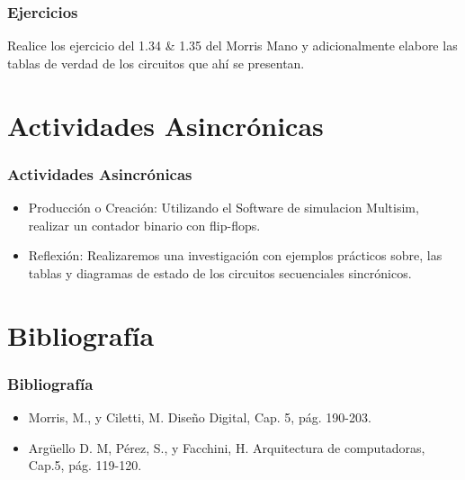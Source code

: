 \documentclass[11pt]{beamer}
\begin{document}
\begin{frame}
\frametitle{Ejercicios}
Realice los ejercicio del 1.34 \& 1.35 del Morris Mano y adicionalmente elabore las tablas de verdad de los circuitos que ah\'i se presentan.
\end{frame}

\section{Actividades Asincr\'onicas}
\begin{frame}
\frametitle{Actividades Asincr\'onicas}
	\begin{itemize}
		\item Producci\'on o Creaci\'on: Utilizando el Software de simulacion Multisim, realizar un contador binario con flip-flops.
		\item Reflexi\'on: Realizaremos una investigación con ejemplos pr\'acticos sobre, las tablas y diagramas de estado de los circuitos secuenciales sincrónicos.
		\end{itemize}
\end{frame}

\section{Bibliograf\'ia}
\begin{frame}
	\frametitle{Bibliograf\'ia}
	\begin{itemize}
		\item Morris, M., y Ciletti, M. Diseño Digital, Cap. 5, pág. 190-203.
		\item Argüello D. M, Pérez, S., y Facchini, H. Arquitectura de computadoras, Cap.5, pág. 119-120.
		\end{itemize}
\end{frame}
\end{document}
